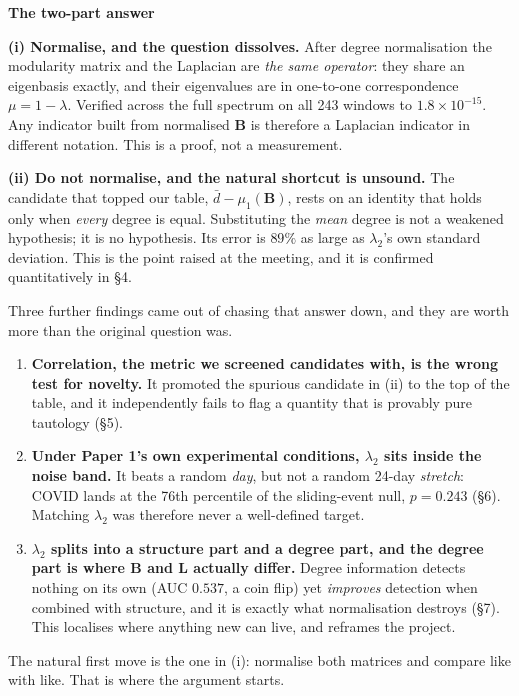 \documentclass[11pt,a4paper]{article}
\newcommand{\Lap}{\mathbf{L}}
\newcommand{\Bmat}{\mathbf{B}}
\newenvironment{aside}[1]
 {\par\vspace{2.5mm}\begin{lrbox}{\asidebox}%
  \begin{minipage}{\dimexpr\textwidth-16pt\relax}\small\textbf{#1}\par\vspace{1mm}}
 {\end{minipage}\end{lrbox}%
  \noindent\setlength{\fboxsep}{7pt}\setlength{\fboxrule}{.4pt}%
  \fcolorbox{Rule}{Panel2}{\usebox{\asidebox}}\par\vspace{2.5mm}}
\begin{document}
\begin{aside}{The two-part answer}
\textbf{(i) Normalise, and the question dissolves.} After degree normalisation the
modularity matrix and the Laplacian are \emph{the same operator}: they share an
eigenbasis exactly, and their eigenvalues are in one-to-one correspondence
$\mu = 1-\lambda$. Verified across the full spectrum on all 243 windows to
$1.8\times10^{-15}$. Any indicator built from normalised $\Bmat$ is therefore a
Laplacian indicator in different notation. This is a proof, not a measurement.

\smallskip
\textbf{(ii) Do not normalise, and the natural shortcut is unsound.} The candidate
that topped our table, $\bar{d}-\mu_1(\Bmat)$, rests on an identity that holds
only when \emph{every} degree is equal. Substituting the \emph{mean} degree is not
a weakened hypothesis; it is no hypothesis. Its error is $89\%$ as large as
$\lambda_2$'s own standard deviation. This is the point raised at the meeting, and
it is confirmed quantitatively in \S4.
\end{aside}

Three further findings came out of chasing that answer down, and they are worth
more than the original question was.

\begin{enumerate}[label=\textbf{\arabic*.}]
\item \textbf{Correlation, the metric we screened candidates with, is the wrong
test for novelty.} It promoted the spurious candidate in (ii) to the top of the
table, and it independently fails to flag a quantity that is provably pure
tautology (\S5).
\item \textbf{Under Paper 1's own experimental conditions, $\lambda_2$ sits inside
the noise band.} It beats a random \emph{day}, but not a random 24-day
\emph{stretch}: COVID lands at the 76th percentile of the sliding-event null,
$p=0.243$ (\S6). Matching $\lambda_2$ was therefore never a well-defined target.
\item \textbf{$\lambda_2$ splits into a structure part and a degree part, and the
degree part is where $\Bmat$ and $\Lap$ actually differ.} Degree information
detects nothing on its own (AUC $0.537$, a coin flip) yet \emph{improves} detection
when combined with structure, and it is exactly what normalisation destroys
(\S7). This localises where anything new can live, and reframes the project.
\end{enumerate}

The natural first move is the one in (i): normalise both matrices and compare
like with like. That is where the argument starts.
\end{document}
